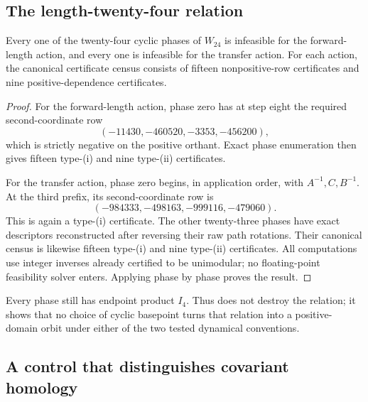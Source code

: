\subsection{The length-twenty-four relation}

\begin{theorem}
\label{thm:W24-all-phases}
Every one of the twenty-four cyclic phases of $W_{24}$ is infeasible for the
forward-length action, and every one is infeasible for the transfer action.
For each action, the canonical certificate census consists of fifteen
nonpositive-row certificates and nine positive-dependence certificates.
\end{theorem}

\begin{proof}
For the forward-length action, phase zero has at step eight the required
second-coordinate row
\begin{equation}
 (-11430,-460520,-3353,-456200),
 \label{eq:W24-length-row}
\end{equation}
which is strictly negative on the positive orthant.  Exact phase enumeration
then gives fifteen type-(i) and nine type-(ii) certificates.

For the transfer action, phase zero begins, in application order, with
$A^{-1},C,B^{-1}$.  At the third prefix, its second-coordinate row is
\begin{equation}
 (-984333,-498163,-999116,-479060).
 \label{eq:W24-transfer-row}
\end{equation}
This is again a type-(i) certificate.  The other twenty-three phases have
exact descriptors reconstructed after reversing their raw path rotations.
Their canonical census is likewise fifteen type-(i) and nine type-(ii)
certificates.
All computations use integer inverses already certified to be unimodular; no
floating-point feasibility solver enters.  Applying
 phase by phase proves the result.
\end{proof}

Every phase still has endpoint product $I_4$.  Thus
 does not destroy the relation; it shows that no
choice of cyclic basepoint turns that relation into a positive-domain orbit
under either of the two tested dynamical conventions.

\subsection{A control that distinguishes covariant homology}

